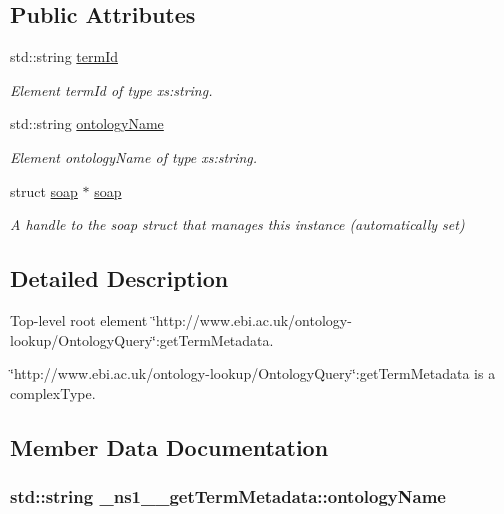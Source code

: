 \subsection*{Public Attributes}
\begin{DoxyCompactItemize}
\item 
std::string \hyperlink{class__ns1____getTermMetadata_ab47b4b287ed1e7291f6a2bdc8fee4eb6}{termId}
\begin{DoxyCompactList}\small\item\em Element termId of type xs:string. \end{DoxyCompactList}\item 
std::string \hyperlink{class__ns1____getTermMetadata_ac3be04861c01daf56914ee8d2f7c9245}{ontologyName}
\begin{DoxyCompactList}\small\item\em Element ontologyName of type xs:string. \end{DoxyCompactList}\item 
\hypertarget{class__ns1____getTermMetadata_a93bc82e6a5eb678ebde6718bd0813454}{
struct \hyperlink{class__ns1____getTermMetadata_a93bc82e6a5eb678ebde6718bd0813454}{soap} $\ast$ \hyperlink{class__ns1____getTermMetadata_a93bc82e6a5eb678ebde6718bd0813454}{soap}}
\label{class__ns1____getTermMetadata_a93bc82e6a5eb678ebde6718bd0813454}

\begin{DoxyCompactList}\small\item\em A handle to the soap struct that manages this instance (automatically set) \end{DoxyCompactList}\end{DoxyCompactItemize}


\subsection{Detailed Description}
Top-\/level root element \char`\"{}http://www.ebi.ac.uk/ontology-\/lookup/OntologyQuery\char`\"{}:getTermMetadata. 

\char`\"{}http://www.ebi.ac.uk/ontology-\/lookup/OntologyQuery\char`\"{}:getTermMetadata is a complexType. 

\subsection{Member Data Documentation}
\hypertarget{class__ns1____getTermMetadata_ac3be04861c01daf56914ee8d2f7c9245}{
\subsubsection[{ontologyName}]{\setlength{\rightskip}{0pt plus 5cm}std::string {\bf \_\-ns1\_\-\_\-getTermMetadata::ontologyName}}}
\label{class__ns1____getTermMetadata_ac3be04861c01daf56914ee8d2f7c9245}


